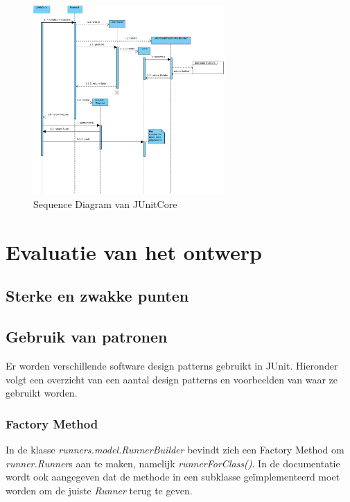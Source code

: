 \documentclass[i1]{oss}
\begin{document}
\begin{figure}[h!]
	\centering
	\includegraphics[width=0.65\textwidth]{JUnitCoreSequenceDiagram}
	\caption{Sequence Diagram van JUnitCore}
	\label{fig:junitsequence}
\end{figure}



\section{Evaluatie van het ontwerp}


\subsection{Sterke en zwakke punten}

\subsection{Gebruik van patronen}

Er worden verschillende software design patterns gebruikt in JUnit. 
Hieronder volgt een overzicht van een aantal design patterns en voorbeelden van waar ze gebruikt worden.

\subsubsection{Factory Method}
In de klasse \emph{runners.model.RunnerBuilder} bevindt zich een Factory Method om \emph{runner.Runner}s aan te maken, namelijk \emph{runnerForClass()}. 
In de documentatie wordt ook aangegeven dat de methode in een subklasse ge\"implementeerd moet worden om de juiste \emph{Runner} terug te geven.
\end{document}
